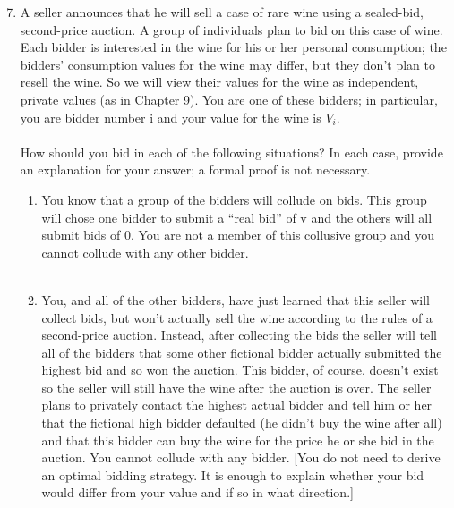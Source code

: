 \documentclass[11pt]{article}
\begin{document}
\begin{enumerate}
	\setcounter{enumi}{6}
	\item A seller announces that he will sell a case of rare wine using a sealed-bid, second-price auction. A group of individuals plan to bid on this case of wine. Each bidder is interested in the wine for his or her personal consumption; the bidders’ consumption values for the wine may differ, but they don’t plan to resell the wine. So we will view their values for the wine as independent, private values (as in Chapter 9). You are one of these bidders; in particular, you are bidder number i and your value for the wine is $V_i$.\\\\
How should you bid in each of the following situations? In each case, provide an explanation for your answer; a formal proof is not necessary.
	\begin{enumerate}
		\item  You know that a group of the bidders will collude on bids. This group will chose one bidder to submit a “real bid” of v and the others will all submit bids of 0. You are not a member of this collusive group and you cannot collude with any other bidder. \\\\
		\item You, and all of the other bidders, have just learned that this seller will collect bids, but won’t actually sell the wine according to the rules of a second-price auction. Instead, after collecting the bids the seller will tell all of the bidders that some other fictional bidder actually submitted the highest bid and so won the auction. This bidder,
of course, doesn’t exist so the seller will still have the wine after the auction is over. The seller plans to privately contact the highest actual bidder and tell him or her that the fictional high bidder defaulted (he didn’t buy the wine after all) and that this bidder can buy the wine for the price he or she bid in the auction. You cannot collude with any bidder. [You do not need to derive an optimal bidding strategy. It is enough to explain whether your bid would differ from your value and if so in what direction.]
	\end{enumerate}
\end{enumerate}
\end{document}
